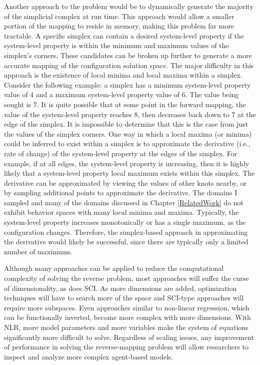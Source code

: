 Another approach to the problem would be to dynamically generate the majority of the simplicial complex at run time.
This approach would allow a smaller portion of the mapping to reside in memory, making this problem far more tractable.
A specific simplex can contain a desired system-level property if the system-level property is within the minimum and maximum values of the simplex's corners.
These candidates can be broken up further to generate a more accurate mapping of the configuration solution space.
The major difficulty in this approach is the existence of local minima and local maxima within a simplex.
Consider the following example: a simplex has a minimum system-level property value of 4 and a maximum system-level property value of 6.
The value being sought is 7.
It is quite possible that at some point in the forward mapping, the value of the system-level property reaches 8, then decreases back down to 7 at the edge of the simplex.
It is impossible to determine that this is the case from just the values of the simplex corners.
One way in which a local maxima (or minima) could be inferred to exist within a simplex is to approximate the derivative (i.e., rate of change) of the system-level property at the edges of the simplex.
For example, if at all edges, the system-level property is increasing, then it is highly likely that a system-level property local maximum exists within this simplex.
The derivative can be approximated by viewing the values of other knots nearby, or by sampling additional points to approximate the derivative.
The domains I sampled and many of the domains discussed in Chapter \ref{RelatedWork} do not exhibit behavior spaces with many local minima and maxima.
Typically, the system-level property increases monotonically or has a single maximum, as the configuration changes.
Therefore, the simplex-based approach in approximating the derivative would likely be successful, since there are typically  only a limited number of maximums.

Although many approaches can be applied to reduce the computational complexity of solving the reverse problem, most approaches will suffer the curse of dimensionality, as does SCI.
As more dimensions are added, optimization techniques will have to search more of the space and SCI-type approaches will require more subspaces.
Even approaches similar to non-linear regression, which can be functionally inverted, become more complex with more dimensions.
With NLR, more model parameters and more variables make the system of equations significantly more difficult to solve.
Regardless of scaling issues, any improvement of performance in solving the reverse-mapping problem will allow researchers to inspect and analyze more complex agent-based models.

